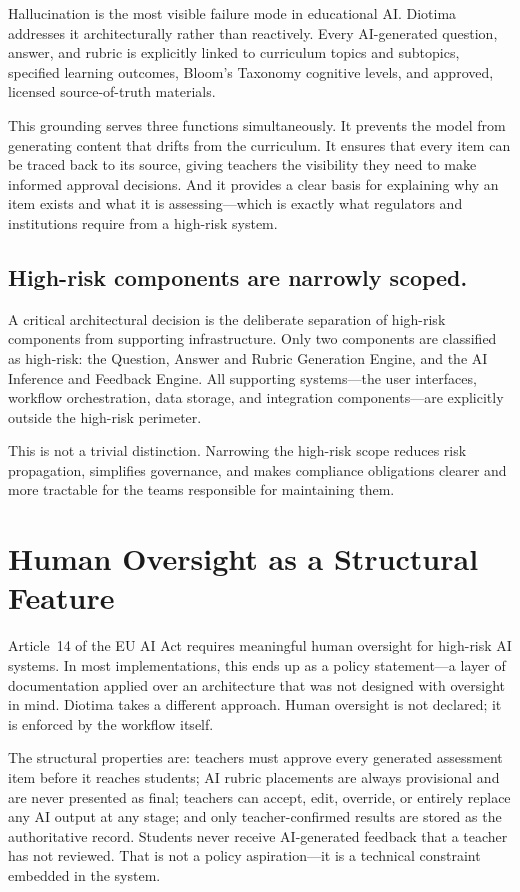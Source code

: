 \documentclass[10pt, a4paper, twocolumn]{article}
\begin{document}
Hallucination is the most visible failure mode in educational AI.
Diotima addresses it architecturally rather than reactively. Every
AI-generated question, answer, and rubric is explicitly linked to curriculum
topics and subtopics, specified learning outcomes, Bloom's Taxonomy cognitive levels,
and approved, licensed source-of-truth materials.

This grounding serves three functions simultaneously. It prevents the model from
generating content that drifts from the curriculum. It ensures that every item can
be traced back to its source, giving teachers the visibility they need to make informed
approval decisions. And it provides a clear basis for explaining why an item exists and
what it is assessing---which is exactly what regulators and institutions require from
a high-risk system.

\subsection{High-risk components are narrowly scoped.}

A critical architectural decision is the deliberate separation of
high-risk components from supporting infrastructure. Only two components
are classified as high-risk: the Question, Answer and Rubric Generation Engine, and
the AI Inference and Feedback Engine. All supporting systems---the user interfaces,
workflow orchestration, data storage, and integration components---are explicitly
outside the high-risk perimeter.

This is not a trivial distinction. Narrowing the high-risk scope reduces risk
propagation, simplifies governance, and makes compliance obligations clearer and more
tractable for the teams responsible for maintaining them.

\section{Human Oversight as a Structural Feature}

Article~14 of the EU AI Act requires meaningful human oversight for high-risk AI
systems. In most implementations, this ends up as a policy statement---a layer of
documentation applied over an architecture that was not designed with oversight in
mind. Diotima takes a different approach. Human oversight is not declared; it is
enforced by the workflow itself.

The structural properties are: teachers must approve every generated assessment item
before it reaches students; AI rubric placements are always provisional and are never
presented as final; teachers can accept, edit, override, or entirely replace any AI
output at any stage; and only teacher-confirmed results are stored as the authoritative
record. Students never receive AI-generated feedback that a teacher has not reviewed.
That is not a policy aspiration---it is a technical constraint embedded in the system.
\end{document}
